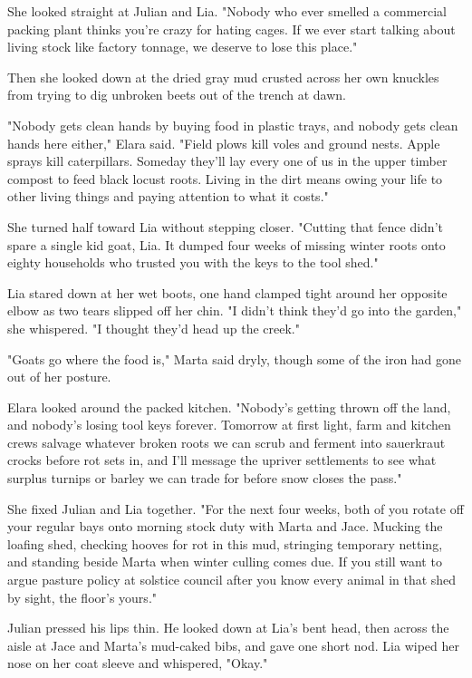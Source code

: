 She looked straight at Julian and Lia. "Nobody who ever smelled a commercial packing plant thinks you're crazy for hating cages. If we ever start talking about living stock like factory tonnage, we deserve to lose this place."

Then she looked down at the dried gray mud crusted across her own knuckles from trying to dig unbroken beets out of the trench at dawn.

"Nobody gets clean hands by buying food in plastic trays, and nobody gets clean hands here either," Elara said. "Field plows kill voles and ground nests. Apple sprays kill caterpillars. Someday they'll lay every one of us in the upper timber compost to feed black locust roots. Living in the dirt means owing your life to other living things and paying attention to what it costs."

She turned half toward Lia without stepping closer. "Cutting that fence didn't spare a single kid goat, Lia. It dumped four weeks of missing winter roots onto eighty households who trusted you with the keys to the tool shed."

Lia stared down at her wet boots, one hand clamped tight around her opposite elbow as two tears slipped off her chin. "I didn't think they'd go into the garden," she whispered. "I thought they'd head up the creek."

"Goats go where the food is," Marta said dryly, though some of the iron had gone out of her posture.

Elara looked around the packed kitchen. "Nobody's getting thrown off the land, and nobody's losing tool keys forever. Tomorrow at first light, farm and kitchen crews salvage whatever broken roots we can scrub and ferment into sauerkraut crocks before rot sets in, and I'll message the upriver settlements to see what surplus turnips or barley we can trade for before snow closes the pass."

She fixed Julian and Lia together. "For the next four weeks, both of you rotate off your regular bays onto morning stock duty with Marta and Jace. Mucking the loafing shed, checking hooves for rot in this mud, stringing temporary netting, and standing beside Marta when winter culling comes due. If you still want to argue pasture policy at solstice council after you know every animal in that shed by sight, the floor's yours."

Julian pressed his lips thin. He looked down at Lia's bent head, then across the aisle at Jace and Marta's mud-caked bibs, and gave one short nod. Lia wiped her nose on her coat sleeve and whispered, "Okay."


